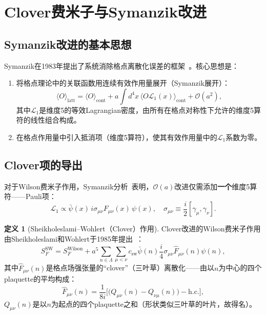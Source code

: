\documentclass[12pt,a4paper]{ctexart}
\theoremstyle{definition}
\newtheorem{definition}{定义}[section]
\begin{document}
\section{Clover费米子与Symanzik改进}

\subsection{Symanzik改进的基本思想}

Symanzik在1983年提出了系统消除格点离散化误差的框架~\cite{Symanzik1983}。核心思想是：
\begin{enumerate}
    \item 将格点理论中的关联函数用连续有效作用量展开（Symanzik展开）：
    \begin{equation}
    \langle O \rangle_{\text{latt}} = \langle O \rangle_{\text{cont}} + a\int d^4x\, \langle O \mathcal{L}_1(x) \rangle_{\text{cont}} + \mathcal{O}(a^2),
    \label{eq:Symanzik_expansion}
    \end{equation}
    其中$\mathcal{L}_1$是维度5的等效Lagrangian密度，由所有在格点对称性下允许的维度5算符的线性组合构成。
    \item 在格点作用量中引入抵消项（维度5算符），使其有效作用量中的$\mathcal{L}_1$系数为零。
\end{enumerate}

\subsection{Clover项的导出}

对于Wilson费米子作用，Symanzik分析~\cite{GattringerLang2010}表明，$\mathcal{O}(a)$改进仅需添加\textbf{一个}维度5算符——Pauli项：
\begin{equation}
\mathcal{L}_1 \propto \bar\psi(x)\, i\sigma_{\mu\nu}F_{\mu\nu}(x)\, \psi(x), \quad \sigma_{\mu\nu} \equiv \frac{i}{2}[\gamma_\mu, \gamma_\nu].
\label{eq:Pauli_term}
\end{equation}

\begin{definition}[Sheikholeslami--Wohlert（Clover）作用]
Clover改进的Wilson费米子作用由Sheikholeslami和Wohlert于1985年提出~\cite{SheikholeslamiWohlert1985}：
\begin{equation}
S_F^{\text{SW}} = S_F^{\text{Wilson}} + a^5 \sum_{n\in\Lambda} \sum_{\mu<\nu} c_{\text{sw}} \bar\psi(n) \frac{i}{4}\sigma_{\mu\nu} \hat{F}_{\mu\nu}(n) \psi(n),
\label{eq:clover_action}
\end{equation}
其中$\hat{F}_{\mu\nu}(n)$是格点场强张量的``clover''（三叶草）离散化——由以$n$为中心的四个plaquette的平均构成：
\begin{equation}
\hat{F}_{\mu\nu}(n) = \frac{1}{8i}\Big[\big(Q_{\mu\nu}(n) - Q_{\nu\mu}(n)\big) - \text{h.c.}\Big],
\label{eq:clover_Fmunu}
\end{equation}
$Q_{\mu\nu}(n)$是以$n$为起点的四个plaquette之和（形状类似三叶草的叶片，故得名）。
\end{definition}
\end{document}
